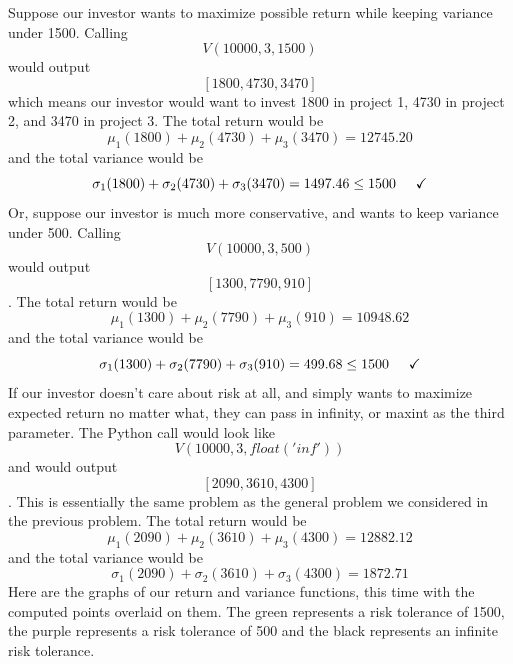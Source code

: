 \documentclass{article}
\begin{document}
Suppose our investor wants to maximize possible return while keeping variance under 1500.
Calling $$V(10000, 3, 1500)$$ would output $$[1800, 4730, 3470]$$ which means our investor would want to invest 1800 in project 1, 4730 in project 2, and 3470 in project 3. 
\newline The total return would be $$\mu_{1}(1800) + \mu_{2}(4730) + \mu_{3}(3470) = 12745.20 $$ and the total variance would be $$\sigma_{1}(1800) + \sigma_{2}(4730) + \sigma_{3}(3470) = 1497.46 \leq 1500 \hspace{.5cm} \checkmark$$
\newline
Or, suppose our investor is much more conservative, and wants to keep variance under 500.  Calling $$V(10000, 3, 500)$$ would output $$[1300, 7790, 910]$$. 
\newline The total return would be $$\mu_{1}(1300) + \mu_{2}(7790) + \mu_{3}(910) = 10948.62 $$ and the total variance would be $$\sigma_{1}(1300) + \sigma_{2}(7790) + \sigma_{3}(910) = 499.68 \leq 1500 \hspace{.5cm} \checkmark$$
\newline
If our investor doesn't care about risk at all, and simply wants to maximize expected return no matter what, they can pass in infinity, or maxint as the third parameter.  The Python call would look like $$V(10000, 3, float('inf'))$$ and would output $$[2090, 3610, 4300]$$. This is essentially the same problem as the general problem we considered in the previous problem.  
The total return would be $$\mu_{1}(2090) + \mu_{2}(3610) + \mu_{3}(4300) = 12882.12 $$ and the total variance would be $$\sigma_{1}(2090) + \sigma_{2}(3610) + \sigma_{3}(4300) = 1872.71 $$
Here are the graphs of our return and variance functions, this time with the computed points overlaid on them.  The green represents a risk tolerance of 1500, the purple represents a risk tolerance of 500 and the black represents an infinite risk tolerance.
\newline
\end{document}
